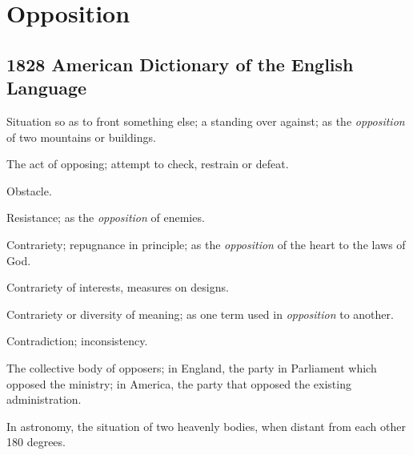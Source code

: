 \section{Opposition}
	\label{OPPOSITION}
	

\subsection{1828 American Dictionary of the English Language} %
	\label{OPPOSITION-1828}

	\begin{compactitem}
		\item[1] Situation so as to front something else; a standing over against; as the \textit{opposition} of two mountains or buildings.
		\item[2] The act of opposing; attempt to check, restrain or defeat.
		\item[3] Obstacle.
		\item[4] Resistance; as the \textit{opposition} of enemies.
		\item[5] Contrariety; repugnance in principle; as the \textit{opposition} of the heart to the laws of God.
		\item[6] Contrariety of interests, measures on designs.
		\item[7] Contrariety or diversity of meaning; as one term used in \textit{opposition} to another. 
		\item[8] Contradiction; inconsistency.
		\item[9] The collective body of opposers; in England, the party in Parliament which opposed the ministry; in America, the party that opposed the existing administration.
		\item[10] In astronomy, the situation of two heavenly bodies, when distant from each other 180 degrees.
	\end{compactitem}


